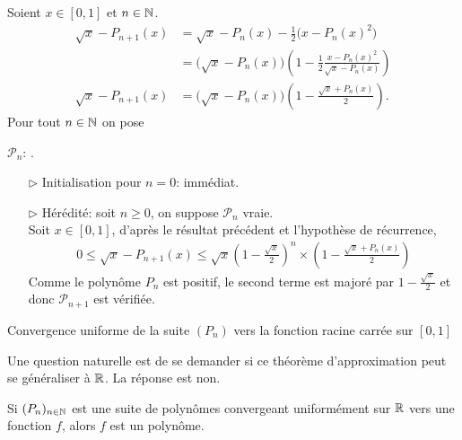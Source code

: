 \begin{solution}
    Soient $x \in [0, 1]$ et $n \in \mathbb{N}$.
    \begin{align*}
        \sqrt{x} - P_{n+1}(x) &= \sqrt{x} - P_n(x) - \frac{1}{2} \big( x - P_n(x)^2  \big) \\
        &= \big(\sqrt{x} - P_n(x) \big) \left( 1 - \frac{1}{2} \frac{x - P_n(x)^2}{\sqrt{x} - P_n(x)} \right) \\
        \sqrt{x} - P_{n+1}(x) &= \big(\sqrt{x} - P_n(x) \big) \left(1 - \frac{\sqrt{x} + P_n(x)}{2} \right).
    \end{align*}
    Pour tout $n \in \mathbb{N}$ on pose
    \begin{center}
        $\mathscr{P}_n$: .
    \end{center}
    \begin{itemize}
        \item[$\rhd$] Initialisation pour $n = 0$: immédiat.
        \item[$\rhd$] Hérédité: soit $n \geqslant 0$, on suppose $\mathscr{P}_n$ vraie. \\
        Soit $x \in [0, 1]$, d'après le résultat précédent et l'hypothèse de récurrence,
        \begin{align*}
            0 \leqslant \sqrt{x} - P_{n+1}(x) \leqslant \sqrt{x} \left( 1 - \frac{\sqrt{x}}{2}  \right)^n \times \left(1 - \frac{\sqrt{x} + P_n(x)}{2} \right)
        \end{align*}
        Comme le polynôme $P_n$ est positif, le second terme est majoré par $1 - \frac{\sqrt{x}}{2}$ et donc $\mathscr{P}_{n+1}$ est vérifiée.
    \end{itemize}
\end{solution}

\begin{marginfigure}[-5cm]
    \centering
	
	\caption*{\centering Convergence uniforme de la suite $(P_n)$ vers la fonction racine carrée sur $[0,1]$}
\end{marginfigure}

Une question naturelle est de se demander si ce théorème d'approximation peut se généraliser à $\mathbb{R}$. La réponse est non.

\begin{prop}
    Si $(P_n)_{n \in \mathbb{N}}$ est une suite de polynômes convergeant uniformément sur $\mathbb{R}$ vers une fonction $f$, alors $f$ est un polynôme.
\end{prop}

